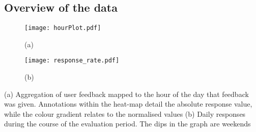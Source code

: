 

\subsection{Overview of the data}




\centering
	\begin{subfigure}[t]{0.5\textwidth}
	\texttt{[image: hourPlot.pdf]}
	\caption{(a)}
	\label{fig:hourPlot}
	\end{subfigure}
	\begin{subfigure}[t]{0.49\textwidth}
	\texttt{[image: response\_rate.pdf]}
	\caption{(b)}
	\label{fig:responseRate}
	\end{subfigure}
	\caption{(a) Aggregation of user feedback mapped to the hour of the day that feedback was given. Annotations within the heat-map detail the absolute response value, while the colour gradient relates to the normalised values (b) Daily responses during the course of the evaluation period. The dips in the graph are weekends}


